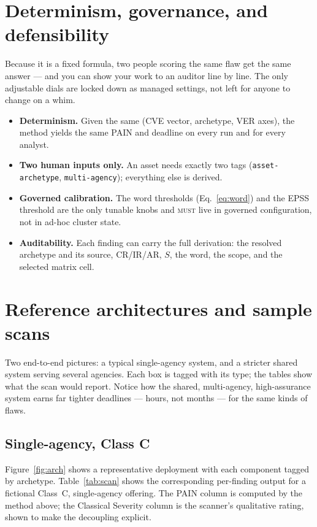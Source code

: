\documentclass[11pt]{article}
\newcommand{\code}[1]{\texttt{#1}}
\newcommand{\rfckw}[1]{\textsc{#1}}
\begin{document}
\section{Determinism, governance, and defensibility}
\begin{plain}
Because it is a fixed formula, two people scoring the same flaw get the same answer
--- and you can show your work to an auditor line by line. The only adjustable dials
are locked down as managed settings, not left for anyone to change on a whim.
\end{plain}
\begin{itemize}[leftmargin=1.4em]
\item \textbf{Determinism.} Given the same (CVE vector, archetype, VER axes), the
  method yields the same PAIN and deadline on every run and for every analyst.
\item \textbf{Two human inputs only.} An asset needs exactly two tags
  (\code{asset-archetype}, \code{multi-agency}); everything else is derived.
\item \textbf{Governed calibration.} The word thresholds
  (Eq.~\eqref{eq:word}) and the EPSS threshold are the only tunable knobs and
  \rfckw{must} live in governed configuration, not in ad-hoc cluster state.
\item \textbf{Auditability.} Each finding can carry the full derivation: the
  resolved archetype and its source, CR/IR/AR, $S$, the word, the scope, and the
  selected matrix cell.
\end{itemize}

\section{Reference architectures and sample scans}
\begin{plain}
Two end-to-end pictures: a typical single-agency system, and a stricter shared
system serving several agencies. Each box is tagged with its type; the tables show
what the scan would report. Notice how the shared, multi-agency, high-assurance
system earns far tighter deadlines --- hours, not months --- for the same kinds of
flaws.
\end{plain}

\subsection{Single-agency, Class C}
Figure~\ref{fig:arch} shows a representative deployment with each component tagged
by archetype. Table~\ref{tab:scan} shows the corresponding per-finding output for a
fictional Class~C, single-agency offering. The PAIN column is computed by the method
above; the Classical Severity column is the scanner's qualitative rating, shown to
make the decoupling explicit.
\end{document}
